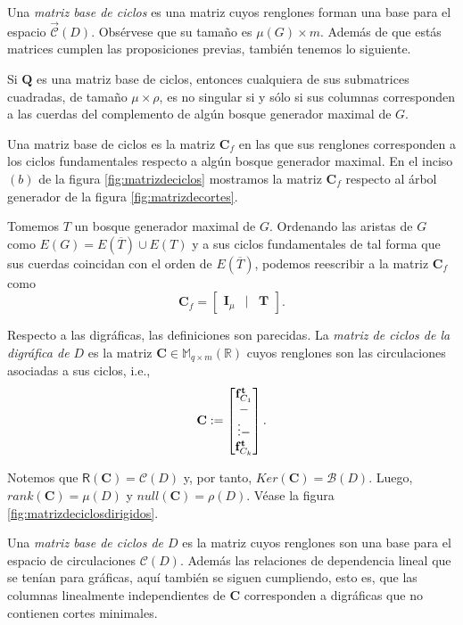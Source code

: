 Una \textit{matriz base de ciclos} es una matriz cuyos renglones forman una base para el espacio $\overrightarrow{\mathcal{C}}(D)$. Obsérvese que su tamaño es $\mu(G) \times m$. Además de que estás matrices cumplen las proposiciones previas, también tenemos lo siguiente.

\begin{teo} \label{teo:submatricesmatridecortes}
Si $\mathbf{Q}$ es una matriz base de ciclos, entonces cualquiera de sus submatrices cuadradas, de tamaño $\mu \times \rho$, es no singular si y sólo si sus columnas corresponden a las cuerdas del complemento de algún bosque generador maximal de $G$.
\end{teo}

Una matriz base de ciclos es la matriz $\mathbf{C}_{f}$ en las que sus renglones corresponden a los ciclos fundamentales respecto a algún bosque generador maximal. En el inciso $(b)$ de la figura \ref{fig:matrizdeciclos} mostramos la matriz $\mathbf{C}_{f}$ respecto al árbol generador de la figura \ref{fig:matrizdecortes}.

Tomemos $T$ un bosque generador maximal de $G$. Ordenando las aristas de $G$ como $E(G) = E(\overline{T}) \cup E(T)$ y a sus ciclos fundamentales de tal forma que sus cuerdas coincidan con el orden de $E(\overline{T})$, podemos reescribir a la matriz $\mathbf{C}_{f}$ como
$$
\mathbf{C}_{f} = \begin{bmatrix}
\mathbf{I}_{\mu} & | & \mathbf{T}
\end{bmatrix}.
$$

Respecto a las digráficas, las definiciones son parecidas. La \textit{matriz de ciclos de la digráfica de $D$} es la matriz $\mathbf{C} \in \mathbb{M}_{q\times m}(\mathbb{R})$ cuyos renglones son las circulaciones asociadas a sus ciclos, i.e., $$ 
\mathbf{C}:= \begin{bmatrix} 
\mathbf{f}_{C_{1}}^{\mathbf{t}} \\
\-- \\
\vdots
\-- \\
\mathbf{f}_{C_{k}}^{\mathbf{t}}
\end{bmatrix}.
$$

Notemos que  $\mathsf{R}(\mathbf{C}) =\mathcal{C}(D)$ y, por tanto, $Ker(\mathbf{C}) = \mathcal{B}(D)$. Luego, $rank(\mathbf{C}) = \mu(D)$ y $null(\mathbf{C}) = \rho(D)$. Véase la figura \ref{fig:matrizdeciclosdirigidos}.

Una \textit{matriz base de ciclos de $D$} es la matriz cuyos renglones son una base para el espacio de circulaciones $\mathcal{C}(D)$. Además las relaciones de dependencia lineal que se tenían para gráficas, aquí también se siguen cumpliendo, esto es, que las columnas linealmente independientes de $\mathbf{C}$ corresponden a digráficas que no contienen cortes minimales.

